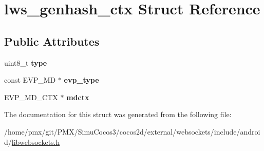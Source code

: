 \hypertarget{structlws__genhash__ctx}{}\section{lws\+\_\+genhash\+\_\+ctx Struct Reference}
\label{structlws__genhash__ctx}
\subsection*{Public Attributes}
\begin{DoxyCompactItemize}
\item 
\mbox{\label{structlws__genhash__ctx_aba107d1a1578cfac21b48bb174537bac}} 
uint8\+\_\+t {\bfseries type}
\item 
\mbox{\label{structlws__genhash__ctx_a792cd5e33a3111fa21faf29aef80b292}} 
const E\+V\+P\+\_\+\+MD $\ast$ {\bfseries evp\+\_\+type}
\item 
\mbox{\label{structlws__genhash__ctx_af140e953dbc2f249c33f5221efff0bff}} 
E\+V\+P\+\_\+\+M\+D\+\_\+\+C\+TX $\ast$ {\bfseries mdctx}
\end{DoxyCompactItemize}


The documentation for this struct was generated from the following file\+:\begin{DoxyCompactItemize}
\item 
/home/pmx/git/\+P\+M\+X/\+Simu\+Cocos3/cocos2d/external/websockets/include/android/\hyperlink{_2cocos2d_2external_2websockets_2include_2android_2libwebsockets_8h}{libwebsockets.\+h}\end{DoxyCompactItemize}
